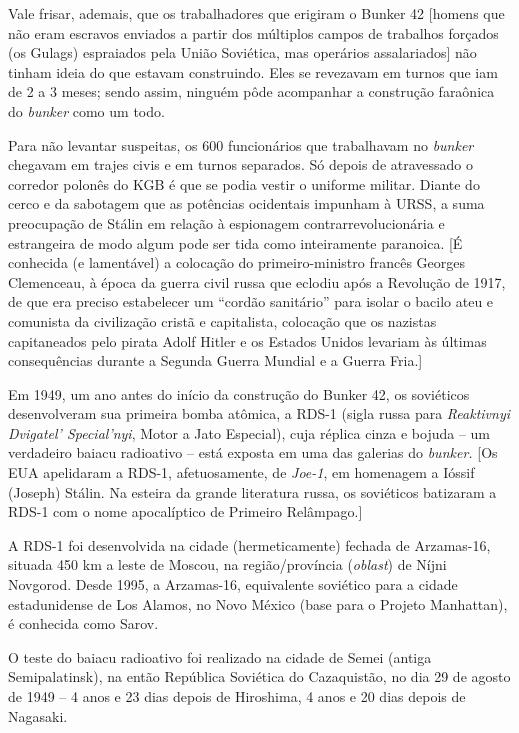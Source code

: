 Vale frisar, ademais, que os trabalhadores que erigiram o Bunker 42
{[}homens que não eram escravos enviados a partir dos múltiplos campos
de trabalhos forçados (os Gulags) espraiados pela União Soviética, mas
operários assalariados{]} não tinham ideia do que estavam construindo.
Eles se revezavam em turnos que iam de 2 a 3 meses; sendo assim, ninguém
pôde acompanhar a construção faraônica do \emph{bunker} como um todo.

Para não levantar suspeitas, os 600 funcionários que trabalhavam no
\emph{bunker} chegavam em trajes civis e em turnos separados. Só depois
de atravessado o corredor polonês do KGB é que se podia vestir o
uniforme militar. Diante do cerco e da sabotagem que as potências
ocidentais impunham à URSS, a suma preocupação de Stálin em relação à
espionagem contrarrevolucionária e estrangeira de modo algum pode ser
tida como inteiramente paranoica. {[}É conhecida (e lamentável) a
colocação do primeiro-ministro francês Georges Clemenceau, à época da
guerra civil russa que eclodiu após a Revolução de 1917, de que era
preciso estabelecer um ``cordão sanitário'' para isolar o bacilo ateu e
comunista da civilização cristã e capitalista, colocação que os nazistas
capitaneados pelo pirata Adolf Hitler e os Estados Unidos levariam às
últimas consequências durante a Segunda Guerra Mundial e a Guerra
Fria.{]}

Em 1949, um ano antes do início da construção do Bunker 42, os
soviéticos desenvolveram sua primeira bomba atômica, a RDS-1 (sigla
russa para \emph{Reaktivnyi Dvigatel' Special'nyi}, Motor a Jato
Especial), cuja réplica cinza e bojuda -- um verdadeiro baiacu
radioativo -- está exposta em uma das galerias do \emph{bunker.} {[}Os
EUA apelidaram a RDS-1, afetuosamente, de \emph{Joe-1}, em homenagem a
Ióssif (Joseph) Stálin. Na esteira da grande literatura russa, os
soviéticos batizaram a RDS-1 com o nome apocalíptico de Primeiro
Relâmpago.{]}

A RDS-1 foi desenvolvida na cidade (hermeticamente) fechada de
Arzamas-16, situada 450 km a leste de Moscou, na região/província
(\emph{oblast}) de Níjni Novgorod. Desde 1995, a Arzamas-16, equivalente
soviético para a cidade estadunidense de Los Alamos, no Novo México
(base para o Projeto Manhattan), é conhecida como Sarov.

O teste do baiacu radioativo foi realizado na cidade de Semei (antiga
Semipalatinsk), na então República Soviética do Cazaquistão, no dia 29
de agosto de 1949 -- 4 anos e 23 dias depois de Hiroshima, 4 anos e 20
dias depois de Nagasaki.


